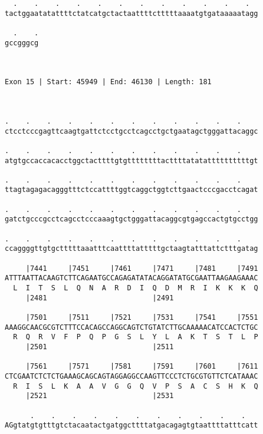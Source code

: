 \documentclass{article}
\begin{document}
\begin{Verbatim}
  .    .    .    .    .    .    .    .    .    .    .    .  
tactggaatatattttctatcatgctactaattttctttttaaaatgtgataaaaatagg
                                                            
  .    .
gccgggcg
        
        
 
Exon 15 | Start: 45949 | End: 46130 | Length: 181



.    .    .    .    .    .    .    .    .    .    .    .    
ctcctcccgagttcaagtgattctcctgcctcagcctgctgaatagctgggattacaggc
                                                            
.    .    .    .    .    .    .    .    .    .    .    .    
atgtgccaccacacctggctacttttgtgttttttttacttttatatattttttttttgt
                                                            
.    .    .    .    .    .    .    .    .    .    .    .    
ttagtagagacagggtttctccattttggtcaggctggtcttgaactcccgacctcagat
                                                            
.    .    .    .    .    .    .    .    .    .    .    .    
gatctgcccgcctcagcctcccaaagtgctgggattacaggcgtgagccactgtgcctgg
                                                            
.    .    .    .    .    .    .    .    .    .    .    .    
ccaggggttgtgctttttaaatttcaattttatttttgctaagtatttattctttgatag
                                                            
     |7441     |7451     |7461     |7471     |7481     |7491
ATTTAATTACAAGTCTTCAGAATGCCAGAGATATACAGGATATGCGAATTAAGAAGAAAC
  L  I  T  S  L  Q  N  A  R  D  I  Q  D  M  R  I  K  K  K  Q
     |2481                         |2491                    
  
     |7501     |7511     |7521     |7531     |7541     |7551
AAAGGCAACGCGTCTTTCCACAGCCAGGCAGTCTGTATCTTGCAAAAACATCCACTCTGC
  R  Q  R  V  F  P  Q  P  G  S  L  Y  L  A  K  T  S  T  L  P
     |2501                         |2511                    
  
     |7561     |7571     |7581     |7591     |7601     |7611
CTCGAATCTCTCTGAAAGCAGCAGTAGGAGGCCAAGTTCCCTCTGCGTGTTCTCATAAAC
  R  I  S  L  K  A  A  V  G  G  Q  V  P  S  A  C  S  H  K  Q
     |2521                         |2531                    
  
      .    .    .    .    .    .    .    .    .    .    .   
AGgtatgtgtttgtctacaatactgatggcttttatgacagagtgtaattttatttcatt
                                                            

\end{Verbatim}
\end{document}
